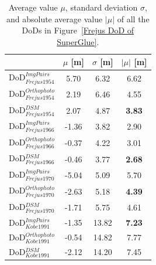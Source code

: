 \begin{table}%
	\footnotesize
	\centering
	\begin{tabular}{||l|c|c|c||}\hline
		&$\mu$ [m]&$\sigma$ [m]&$|\mu|$ [m]\\\hline\hline
		DoD$_{Frejus1954}^{ImgPairs}$ & 5.70 & 6.32 & 6.62\\
		DoD$_{Frejus1954}^{Orthophoto}$ & 2.19 & 6.46 & 4.55\\
		DoD$_{Frejus1954}^{DSM}$ & 2.07 & 4.87 & \textbf{3.83}\\\hline
		DoD$_{Frejus1966}^{ImgPairs}$ & -1.36 & 3.82 & 2.90\\
		DoD$_{Frejus1966}^{Orthophoto}$ & -0.37 & 4.22 & 3.01\\
		DoD$_{Frejus1966}^{DSM}$ & -0.46 & 3.77 & \textbf{2.68}\\\hline
		DoD$_{Frejus1970}^{ImgPairs}$ & -5.04 & 5.09 & 5.70\\
		DoD$_{Frejus1970}^{Orthophoto}$ & -2.63 & 5.18 & \textbf{4.39}\\
		DoD$_{Frejus1970}^{DSM}$ & -1.71 & 5.75 & 4.61\\\hline
		DoD$_{Kobe1991}^{ImgPairs}$ &-1.35 & 13.82 & \textbf{7.23}\\
		DoD$_{Kobe1991}^{Orthophoto}$ &-0.54 & 14.82 & 7.77\\
		DoD$_{Kobe1991}^{DSM}$ &-2.12 & 14.20 & 7.45\\\hline
	\end{tabular}
	\caption{Average value $\mu$, standard deviation $\sigma$, and absolute average value $|\mu|$ of all the DoDs in Figure~\ref{Frejus DoD of SuperGlue}.}
	\label{CheckptAcuracy}
\end{table}




